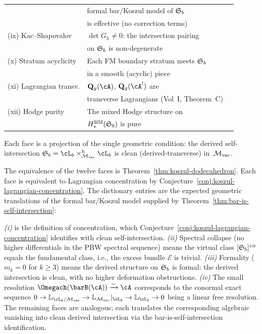 \begin{conjecture}
\begin{center}
\begin{tabular}{@{}lll@{}}
 & formal bar/Koszul model of $\mathfrak{S}_b$ \\
 & is effective (no correction terms) \\
\textup{(ix)} Kac--Shapovalov &
 $\det G_h \neq 0$: the intersection pairing \\
 & on $\mathfrak{S}_b$ is non-degenerate \\
\textup{(x)} Stratum acyclicity &
 Each FM boundary stratum meets $\mathfrak{S}_b$ \\
 & in a smooth (acyclic) piece \\
\textup{(xi)} Lagrangian transv. &
 $\mathbf{Q}_g(\cA)$, $\mathbf{Q}_g(\cA^!)$ are \\
 & transverse Lagrangians (Vol~I, Theorem~C) \\
\textup{(xii)} Hodge purity &
 The mixed Hodge structure on \\
 & $H_*^{\mathrm{BM}}(\mathfrak{S}_b)$ is pure \\
\bottomrule
\end{tabular}
\end{center}
Each face is a projection of the single geometric condition:
the derived self-intersection $\Steinb_b = \cL_b \times_{\Mvac}^h
\cL_b$ is clean (derived-transverse) in~$\mathcal{M}_{\mathrm{vac}}$.
\end{conjecture}

\begin{remark}[Evidence]
The equivalence of the twelve faces is
Theorem~\ref{thm:koszul-dodecahedron}. Each face is equivalent
to Lagrangian concentration by
Conjecture~\ref{conj:koszul-lagrangian-concentration}. The dictionary
entries are the expected geometric translations of the
formal bar/Koszul model supplied by
Theorem~\ref{thm:bar-is-self-intersection}:

\emph{(i)} is the definition of concentration, which
Conjecture~\ref{conj:koszul-lagrangian-concentration} identifies with
clean self-intersection.
\emph{(ii)} Spectral collapse (no higher differentials in the PBW
spectral sequence) means the virtual class
$[\mathfrak{S}_b]^{\mathrm{vir}}$ equals the fundamental class, i.e.,
the excess bundle $\mathcal{E}$ is trivial.
\emph{(iii)} Formality ($m_k = 0$ for $k \geq 3$) means
the derived structure on $\mathfrak{S}_b$ is formal: the derived
intersection is clean, with no higher deformation obstructions.
\emph{(iv)} The small resolution
$\Omegach(\barB(\cA)) \xrightarrow{\sim} \cA$ corresponds to
the conormal exact sequence
$0 \to \mathbb{L}_{\cL_b/\Mvac} \to \mathbb{L}_{\Mvac}|_{\cL_b}
\to \mathbb{L}_{\cL_b} \to 0$ being a linear free resolution.
The remaining faces are analogous; each translates the
corresponding algebraic vanishing into clean derived intersection
via the bar-is-self-intersection identification.
\end{remark}

